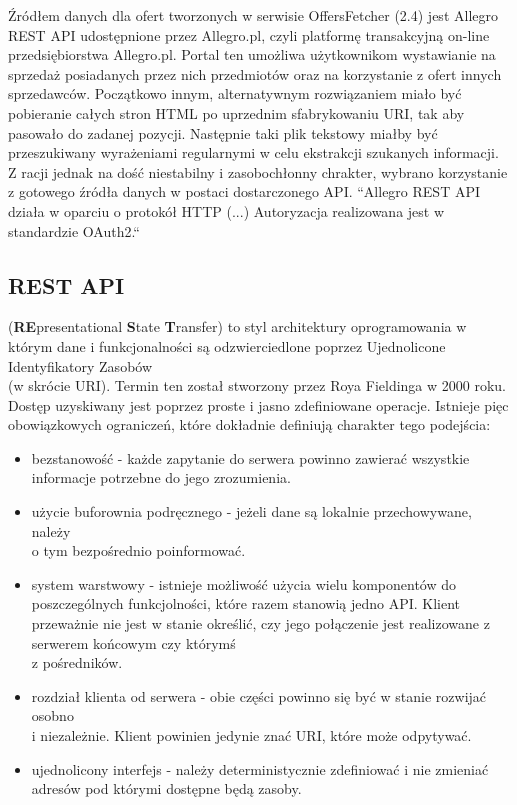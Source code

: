 Źródłem danych dla ofert tworzonych w serwisie OffersFetcher (2.4)
jest Allegro REST API udostępnione przez Allegro.pl, czyli platformę transakcyjną on-line przedsiębiorstwa Allegro.pl. Portal ten umożliwa użytkownikom wystawianie na sprzedaż posiadanych przez nich przedmiotów oraz na korzystanie z ofert innych sprzedawców.  Początkowo innym, alternatywnym rozwiązaniem miało być pobieranie całych stron HTML po uprzednim sfabrykowaniu URI, tak aby pasowało do zadanej pozycji. Następnie taki plik tekstowy miałby być przeszukiwany wyrażeniami regularnymi w celu ekstrakcji szukanych informacji. Z racji jednak na dość niestabilny i zasobochłonny chrakter, wybrano korzystanie\\z gotowego źródła danych w postaci dostarczonego API.\newline
``Allegro REST API działa w oparciu o protokół HTTP (...) Autoryzacja realizowana jest w standardzie OAuth2.``~\cite{allegroApi}

\subsection{REST API}
(\textbf{RE}presentational \textbf{S}tate \textbf{T}ransfer) to styl architektury oprogramowania w którym dane i funkcjonalności są odzwierciedlone poprzez Ujednolicone Identyfikatory Zasobów\\(w skrócie URI). Termin ten został stworzony przez Roya Fieldinga w 2000 roku. Dostęp uzyskiwany jest poprzez proste i jasno zdefiniowane operacje.  Istnieje pięc obowiązkowych ograniczeń, które dokładnie definiują charakter tego podejścia:
\begin{itemize}
	\item bezstanowość - każde zapytanie do serwera powinno zawierać wszystkie informacje potrzebne do jego zrozumienia.
	\item użycie buforownia podręcznego - jeżeli dane są lokalnie przechowywane, należy\\o tym bezpośrednio poinformować.
	\item system warstwowy - istnieje możliwość użycia wielu komponentów do poszczególnych funkcjolności, które razem stanowią jedno API. Klient przeważnie nie jest w stanie określić, czy jego połączenie jest realizowane z serwerem końcowym czy którymś\\z pośredników.
	\item rozdział klienta od serwera - obie części powinno się być w stanie rozwijać osobno\\i niezależnie. Klient powinien jedynie znać URI, które może odpytywać.
	\item ujednolicony interfejs - należy deterministycznie zdefiniować i nie zmieniać adresów pod którymi dostępne będą zasoby. 
\end{itemize}~\cite{fielding}

